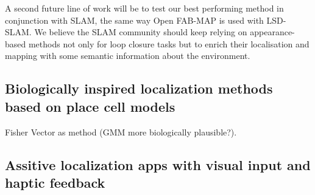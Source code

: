 A second future line of work will be to test our best performing method in conjunction with SLAM, the same way Open FAB-MAP is used with LSD-SLAM. We believe the SLAM community should keep relying on appearance-based methods not only for loop closure tasks but to enrich their localisation and mapping with some semantic information about the environment.
\subsection{Biologically inspired localization methods based on place cell models}
Fisher Vector as method (GMM more biologically plausible?).
\subsection{Assitive localization apps with visual input and haptic feedback}


